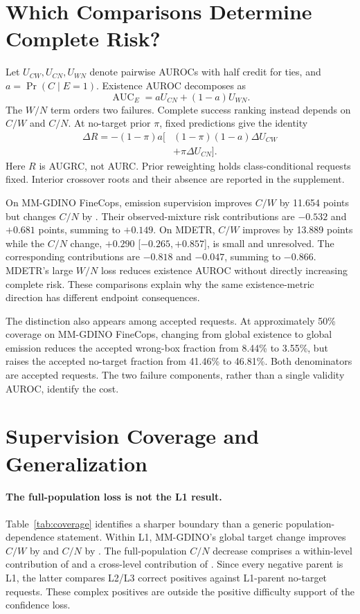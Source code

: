 \documentclass[10pt,twocolumn,letterpaper]{article}
\begin{document}
\section{Which Comparisons Determine Complete Risk?}

Let $U_{CW},U_{CN},U_{WN}$ denote pairwise AUROCs with half credit
for ties, and $a=\Pr(C\mid E=1)$. Existence AUROC decomposes as
\begin{equation}
\operatorname{AUC}_E=aU_{CN}+(1-a)U_{WN}.
\end{equation}
The $W/N$ term orders two failures. Complete success ranking instead
depends on $C/W$ and $C/N$. At no-target prior $\pi$, fixed predictions
give the identity
\begin{align}
\Delta R=-(1-\pi)a\big[&(1-\pi)(1-a)\Delta U_{CW}\nonumber\\
 &+\pi\Delta U_{CN}\big].\label{eq:augrc}
\end{align}
Here $R$ is AUGRC, not AURC. Prior reweighting holds class-conditional
requests fixed. Interior crossover roots and their absence are reported
in the supplement.

On MM-GDINO FineCops, emission supervision improves $C/W$ by 11.654
points but changes $C/N$ by \AllCN{}. Their observed-mixture risk
contributions are $-0.532$ and $+0.681$ points, summing to $+0.149$.
On MDETR, $C/W$ improves by 13.889 points while the $C/N$ change,
$+0.290$ [$-0.265,+0.857$], is small and unresolved. The corresponding
contributions are $-0.818$ and $-0.047$, summing to $-0.866$.
MDETR's large $W/N$ loss reduces existence AUROC without directly
increasing complete risk. These comparisons explain why the same
existence-metric direction has different endpoint consequences.

The distinction also appears among accepted requests. At approximately
50\% coverage on MM-GDINO FineCops, changing from global existence to
global emission reduces the accepted wrong-box fraction from 8.44\% to
3.55\%, but raises the accepted no-target fraction from 41.46\% to
46.81\%. Both denominators are accepted requests. The two failure
components, rather than a single validity AUROC, identify the cost.

\section{Supervision Coverage and Generalization}

\paragraph{The full-population loss is not the L1 result.}
Table~\ref{tab:coverage} identifies a sharper boundary than a generic
population-dependence statement. Within L1, MM-GDINO's global target
change improves $C/W$ by \LoneCW{} and $C/N$ by \LoneCN{}.
The full-population $C/N$ decrease comprises a within-level contribution
of \WithinCN{} and a cross-level contribution of \AcrossCN{}.
Since every negative parent is L1, the latter compares L2/L3 correct
positives against L1-parent no-target requests. These complex positives
are outside the positive difficulty support of the confidence loss.
\end{document}
